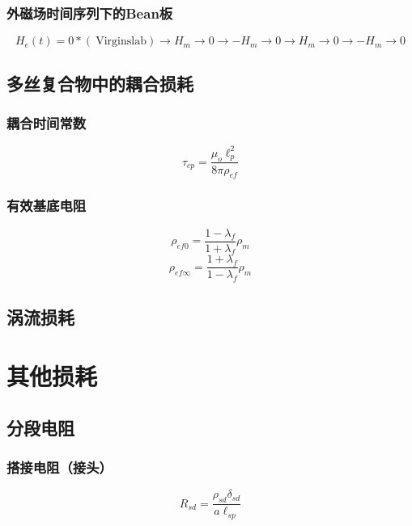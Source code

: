 \subsubsection*{外磁场时间序列下的Bean板}
\begin{equation}%
H_e(t)=0*(\ \mathrm{Virgin slab})\rightarrow H_m\rightarrow 0\rightarrow -H_m\rightarrow 0\rightarrow H_m\rightarrow 0\rightarrow -H_m\rightarrow 0
\end{equation}


\subsection{多丝复合物中的耦合损耗}

\subsubsection*{耦合时间常数}
\begin{equation}%
\tau_{cp}=\frac{\mu_o\ell_{p}^{2}}{8\pi\rho_{ef}}
\end{equation}


\subsubsection*{有效基底电阻}

\begin{equation}%
\rho_{ef0}=\frac{1-\lambda_f}{1+\lambda_f}\rho_m
\end{equation}
\begin{equation}%
\rho_{ef\infty}=\frac{1+\lambda_f}{1-\lambda_f}\rho_m
\end{equation}

\subsection{涡流损耗}

\section{其他损耗}

\subsection{分段电阻}



\subsubsection*{搭接电阻（接头）}
\begin{equation}%
R_{sd}=\frac{\rho_{sd}\delta_{sd}}{a\ell_{sp}}
\end{equation}



